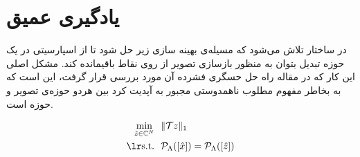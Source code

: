 \chapter{یادگیری عمیق}\label{ch:background|sec:deep-learning}





\begin{figure}
	\centering
	\hspace{0.1\linewidth}
	\hspace{0.1\linewidth}
	\caption{}
	\label{fig:deep-learning-model}
\end{figure}


در ساختار  تلاش می‌شود که مسيله‌ی بهینه سازی زیر حل شود تا از اسپارسیتی در یک حوزه تبدیل بتوان به منظور بازسازی تصویر از روی نقاط باقیمانده کند. مشکل اصلی این کار که در مقاله \cite{Lustig_2007} راه حل حسگری فشرده آن مورد بررسی قرار گرفت، این است که به بخاطر مفهوم مطلوب ناهمدوستی
مجبور به آپدیت کرد بین هردو حوزه‌ی تصویر و حوزه \kspace است.

\removevspace
\begin{subequations}
	\begin{align}
	\min_{\hat{z}\in\mathbb{C}^N} \ \ &\|\mathcal{T}z\|_1 \\
	\lrtext{s.t.} \ \ & \Rho_\Lambda([\hat{x}]) = \Rho_\Lambda([\hat{z}])
	\end{align}
\end{subequations}


